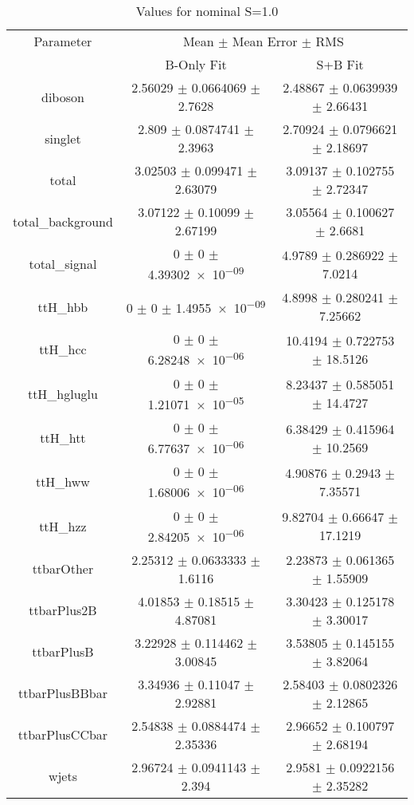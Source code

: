 \begin{table}
\centering
\caption{Values for nominal S=1.0}
\begin{tabular}{ccc}
\toprule
Parameter & \multicolumn{2}{c}{Mean $\pm$ Mean Error $\pm$ RMS}\\
 & B-Only Fit & S+B Fit\\
\midrule
diboson & \num{2.56029} $\pm$ \num{0.0664069} $\pm$ \num{2.7628} & \num{2.48867} $\pm$ \num{0.0639939} $\pm$ \num{2.66431}\\
singlet & \num{2.809} $\pm$ \num{0.0874741} $\pm$ \num{2.3963} & \num{2.70924} $\pm$ \num{0.0796621} $\pm$ \num{2.18697}\\
total & \num{3.02503} $\pm$ \num{0.099471} $\pm$ \num{2.63079} & \num{3.09137} $\pm$ \num{0.102755} $\pm$ \num{2.72347}\\
total\_background & \num{3.07122} $\pm$ \num{0.10099} $\pm$ \num{2.67199} & \num{3.05564} $\pm$ \num{0.100627} $\pm$ \num{2.6681}\\
total\_signal & \num{0} $\pm$ \num{0} $\pm$ \num{4.39302e-09} & \num{4.9789} $\pm$ \num{0.286922} $\pm$ \num{7.0214}\\
ttH\_hbb & \num{0} $\pm$ \num{0} $\pm$ \num{1.4955e-09} & \num{4.8998} $\pm$ \num{0.280241} $\pm$ \num{7.25662}\\
ttH\_hcc & \num{0} $\pm$ \num{0} $\pm$ \num{6.28248e-06} & \num{10.4194} $\pm$ \num{0.722753} $\pm$ \num{18.5126}\\
ttH\_hgluglu & \num{0} $\pm$ \num{0} $\pm$ \num{1.21071e-05} & \num{8.23437} $\pm$ \num{0.585051} $\pm$ \num{14.4727}\\
ttH\_htt & \num{0} $\pm$ \num{0} $\pm$ \num{6.77637e-06} & \num{6.38429} $\pm$ \num{0.415964} $\pm$ \num{10.2569}\\
ttH\_hww & \num{0} $\pm$ \num{0} $\pm$ \num{1.68006e-06} & \num{4.90876} $\pm$ \num{0.2943} $\pm$ \num{7.35571}\\
ttH\_hzz & \num{0} $\pm$ \num{0} $\pm$ \num{2.84205e-06} & \num{9.82704} $\pm$ \num{0.66647} $\pm$ \num{17.1219}\\
ttbarOther & \num{2.25312} $\pm$ \num{0.0633333} $\pm$ \num{1.6116} & \num{2.23873} $\pm$ \num{0.061365} $\pm$ \num{1.55909}\\
ttbarPlus2B & \num{4.01853} $\pm$ \num{0.18515} $\pm$ \num{4.87081} & \num{3.30423} $\pm$ \num{0.125178} $\pm$ \num{3.30017}\\
ttbarPlusB & \num{3.22928} $\pm$ \num{0.114462} $\pm$ \num{3.00845} & \num{3.53805} $\pm$ \num{0.145155} $\pm$ \num{3.82064}\\
ttbarPlusBBbar & \num{3.34936} $\pm$ \num{0.11047} $\pm$ \num{2.92881} & \num{2.58403} $\pm$ \num{0.0802326} $\pm$ \num{2.12865}\\
ttbarPlusCCbar & \num{2.54838} $\pm$ \num{0.0884474} $\pm$ \num{2.35336} & \num{2.96652} $\pm$ \num{0.100797} $\pm$ \num{2.68194}\\
wjets & \num{2.96724} $\pm$ \num{0.0941143} $\pm$ \num{2.394} & \num{2.9581} $\pm$ \num{0.0922156} $\pm$ \num{2.35282}\\
\bottomrule
\end{tabular}
\end{table}